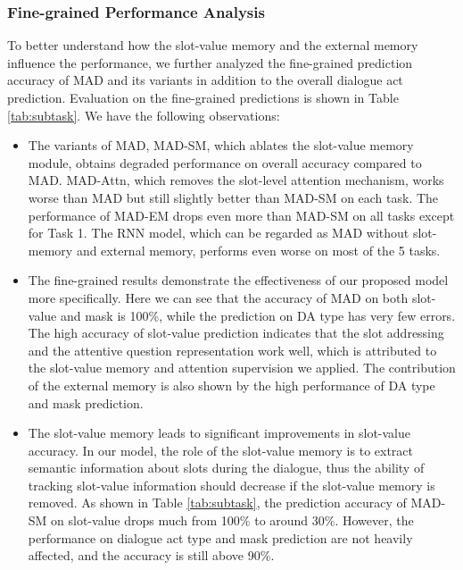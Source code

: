 \subsubsection{Fine-grained Performance Analysis}

To better understand how the slot-value memory and the external memory influence the performance, we further analyzed the fine-grained prediction accuracy of MAD and its variants in addition to the overall dialogue act prediction. Evaluation on the fine-grained predictions is shown in Table \ref{tab:subtask}. We have the following observations:


\begin{itemize}
    \item The variants of MAD, MAD-SM, which ablates the slot-value memory module, obtains degraded performance on overall accuracy compared to MAD. MAD-Attn, which removes the slot-level attention mechanism, works worse than MAD but still slightly better than MAD-SM on each task. The performance of MAD-EM drops even more than MAD-SM on all tasks except for Task 1. The RNN model, which can be regarded as MAD without slot-memory and external memory, performs even worse on most of the 5 tasks.

    \item The fine-grained results demonstrate the effectiveness of our proposed model more specifically. Here we can see that the accuracy of MAD on both slot-value and mask is 100\%, while the prediction on DA type has very few errors. The high accuracy of slot-value prediction indicates that the slot addressing and the attentive question representation work well, which is attributed to the slot-value memory and attention supervision we applied. The contribution of the external memory is also shown by the high performance of DA type and mask prediction.
    
    \item The slot-value memory leads to significant improvements in slot-value accuracy. In our model, the role of the slot-value memory is to extract semantic information about slots during the dialogue, thus the ability of tracking slot-value information should decrease if the slot-value memory is removed. As shown in Table \ref{tab:subtask}, the prediction accuracy of MAD-SM on slot-value drops much from 100\% to around 30\%. However, the performance on dialogue act type and mask prediction are not heavily affected, and the accuracy is still above 90\%.
    

\end{itemize}
